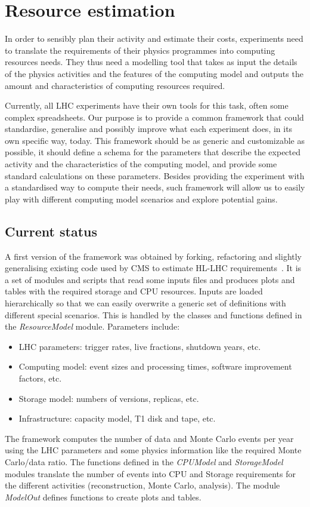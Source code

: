 \section{Resource estimation}
In order to sensibly plan their activity and estimate their costs,
experiments need to translate the requirements of their physics
programmes into computing resources needs. They thus need a modelling
tool that takes as input the details of the physics activities and the
features of the computing model and outputs the amount
and characteristics
of computing resources required.

Currently, all LHC experiments have their own tools for this task,
often some complex spreadsheets. Our purpose is to provide a common
framework that could standardise, generalise and possibly improve what
each experiment does, in its own specific way, today. This framework
should be as generic and customizable as possible, it should define a
schema for the parameters that describe the expected activity and the
characteristics of the computing model, and provide some standard
calculations on these parameters.  Besides providing the experiment
with a standardised way to compute their needs, such framework will
allow us to easily play with different computing model scenarios and
explore potential gains.

\subsection{Current status}
A first version of the framework \cite{ourresmodel} was obtained by
forking, refactoring and slightly generalising existing code used by
CMS to estimate HL-LHC requirements~\cite{cmsresmodel}. It is a set of
modules and scripts that read some inputs files and produces plots and
tables with the required storage and CPU resources. Inputs are loaded
hierarchically so that we can easily overwrite a generic set of
definitions with different special scenarios. This is handled by the
classes and functions defined in the {\it ResourceModel}
module. Parameters include:
\begin{itemize}
\item LHC parameters: trigger rates, live fractions, shutdown years, etc.
\item Computing model: event sizes and processing times, software improvement factors, etc.
\item Storage model: numbers of versions, replicas, etc.
\item Infrastructure: capacity model, T1 disk and tape, etc.
\end{itemize}
The framework computes the number of data and Monte Carlo events per
year using the LHC parameters and some physics information like the
required Monte Carlo/data ratio. The functions defined in the {\it
  CPUModel} and {\it StorageModel} modules translate the number of
events into CPU and Storage requirements for the different activities
(reconstruction, Monte Carlo, analysis).  The module {\it ModelOut}
defines functions to create plots and tables.

